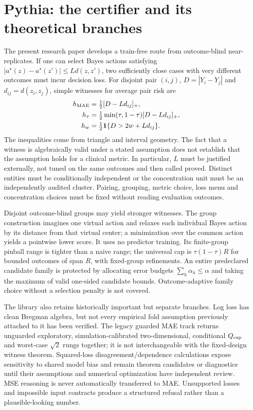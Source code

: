 \documentclass[11pt]{article}
\begin{document}
\section{Pythia: the certifier and its theoretical branches}
The present research paper develops a train-free route from outcome-blind near-replicates. If one can select Bayes actions satisfying $|a^{\star}(z)-a^{\star}(z')|\leq Ld(z,z')$, two sufficiently close cases with very different outcomes must incur decision loss. For disjoint pair $(i,j)$, $D=|Y_i-Y_j|$ and $d_{ij}=d(z_i,z_j)$, simple witnesses for average pair risk are
\begin{align}
h_{\rm MAE}&=\tfrac12[D-Ld_{ij}]_+,\\
h_{\tau}&=\tfrac12\min(\tau,1-\tau)[D-Ld_{ij}]_+,\\
h_w&=\tfrac12\mathbf 1\{D>2w+Ld_{ij}\}.
\end{align}
The inequalities come from triangle and interval geometry. The fact that a witness is algebraically valid under a stated assumption does not establish that the assumption holds for a clinical metric. In particular, $L$ must be justified externally, not tuned on the same outcomes and then called proved. Distinct entities must be conditionally independent or the concentration unit must be an independently audited cluster. Pairing, grouping, metric choice, loss menu and concentration choices must be fixed without reading evaluation outcomes.

Disjoint outcome-blind groups may yield stronger witnesses. The group construction imagines one virtual action and relaxes each individual Bayes action by its distance from that virtual center; a minimization over the common action yields a pointwise lower score. It uses no predictor training. Its finite-group pinball range is tighter than a naive range; the universal cap is $\tau(1-\tau)R$ for bounded outcomes of span $R$, with fixed-group refinements. An entire predeclared candidate family is protected by allocating error budgets $\sum_h\alpha_h\leq\alpha$ and taking the maximum of valid one-sided candidate bounds. Outcome-adaptive family choice without a selection penalty is not covered.

The library also retains historically important but separate branches. Log loss has clean Bregman algebra, but not every empirical fold assumption previously attached to it has been verified. The legacy guarded MAE track returns unguarded exploratory, simulation-calibrated two-dimensional, conditional $Q_{\rm cap}$ and worst-case $\sqrt{2}$ rungs together; it is not interchangeable with the fixed-design witness theorem. Squared-loss disagreement/dependence calculations expose sensitivity to shared model bias and remain theorem candidates or diagnostics until their assumptions and numerical optimization have independent review. MSE reasoning is never automatically transferred to MAE. Unsupported losses and impossible input contracts produce a structured refusal rather than a plausible-looking number.
\end{document}
